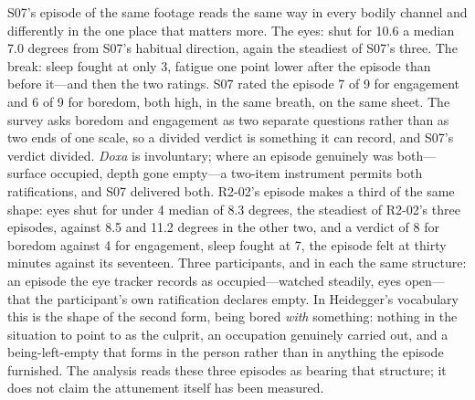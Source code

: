 S07's episode of the same footage reads the same way in every bodily channel and differently in
the one place that matters more. The eyes: shut for 10.6%
a median 7.0 degrees from S07's habitual direction, again the steadiest of S07's three. The
break: sleep fought at only 3, fatigue one point lower after the episode than before it---and
then the two ratings. S07 rated the episode 7 of 9 for engagement and 6 of 9 for boredom, both
high, in the same breath, on the same sheet. The survey asks boredom and engagement as two
separate questions rather than as two ends of one scale, so a divided verdict is something it
can record, and S07's verdict divided. \textit{Doxa} is involuntary; where an episode genuinely
was both---surface occupied, depth gone empty---a two-item instrument permits both
ratifications, and S07 delivered both. R2-02's episode makes a third of the same shape: eyes
shut for under 4%
median of 8.3 degrees, the steadiest of R2-02's three episodes, against 8.5 and 11.2 degrees
in the other two, and a verdict of 8 for boredom against 4 for engagement, sleep fought at 7,
the episode felt at thirty minutes against its seventeen. Three participants, and in each the
same structure: an episode the eye tracker records as occupied---watched steadily, eyes
open---that the participant's own ratification declares empty. In Heidegger's vocabulary this
is the shape of the second form, being bored \textit{with} something: nothing in the situation
to point to as the culprit, an occupation genuinely carried out, and a being-left-empty that
forms in the person rather than in anything the episode furnished. The analysis reads these
three episodes as bearing that structure; it does not claim the attunement itself has been
measured.

